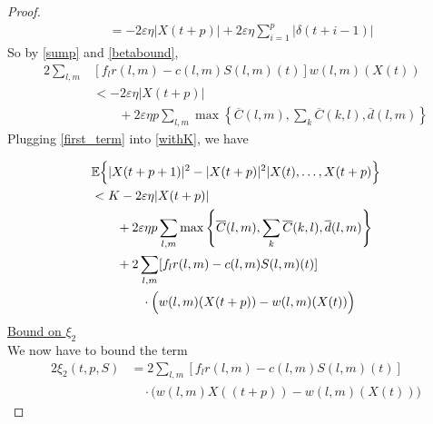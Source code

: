 \begin{proof}
\begin{align}
&= -2\varepsilon \eta   \vert X(t + p) \vert + 2\varepsilon \eta\sum_{i=1}^{p} \vert \delta(t + i -1) \vert 
\label{sump}
\end{align}
So by \eqref{sump} and \eqref{betabound}, 
\begin{align}  \label{first_term}
2\sum_{l,m} & [f_{l}r(l,m) - c(l,m)S(l,m)(t) ]w(l,m)(X(t))  \\ \nonumber
&  < -2\varepsilon \eta  \vert X(t + p) \vert \\ \nonumber
& \qquad + 2\varepsilon \eta  p \sum_{l,m} \max\left\{ \overline{C}(l,m),\sum_{k}\overline{C}(k,l),\overline d(l,m) \right\} 
\end{align}
Plugging \eqref{first_term} into \eqref{withK}, we have

\begin{align} \nonumber
&\expectation{\vert X(t + p +  1)\vert^2 - \vert  X(t + p)\vert^2 \vert X(t),\ldots,X(t + p)}  \\ \nonumber
& < K  -2 \varepsilon \eta \vert X(t + p) \vert  \\ \nonumber
&\qquad + 2\varepsilon \eta p \sum_{l,m} \max\left\{ \overline{C}(l,m),\sum_{k}\overline{C}(k,l),\overline d(l,m) \right\} \\ \nonumber
&  \qquad +2 \sum_{l,m} [f_{l}r(l,m) - c(l,m)S(l,m)(t) ]\\
&\qquad \qquad \cdot\Big(w(l,m)(X(t + p) ) - w(l,m)(X(t))\Big) \label{combined1}
\end{align}
%
\underline{Bound on $\xi_{2}$} \\
We now have to bound the term
\begin{align}\nonumber
2\xi_2(t,p,S) &= 2\sum_{l,m} [f_{l}r(l,m) - c(l,m)S(l,m)(t) ]\\
&\quad \cdot \Big(w(l,m)X((t + p) ) - w(l,m)(X(t))\Big)
\label{2xi2}
\end{align}
%
%

\end{proof}
